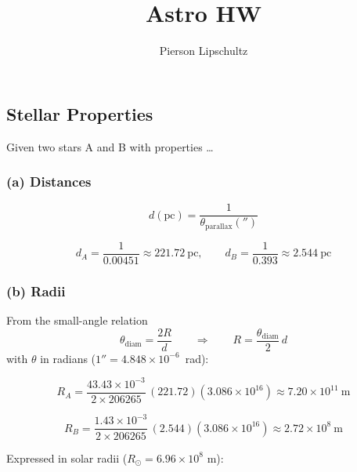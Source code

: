 \documentclass{article}
\title{Astro HW \hwNUM}
\author{Pierson Lipschultz}
\def\hwNUM{8}
\begin{document}
\maketitle


\setcounter{section}{\hwNUM}
\subsection{Stellar Properties}

Given two stars A and B with properties \dots

\begin{table}[htbp]
\end{table}

\subsubsection*{(a) Distances}

\[
d(\mathrm{pc}) = \frac{1}{\theta_\mathrm{parallax}('')}
\]

\[
d_A = \frac{1}{0.00451} \approx 221.72~\mathrm{pc}, \qquad
d_B = \frac{1}{0.393} \approx 2.544~\mathrm{pc}
\]

\subsubsection*{(b) Radii}

From the small-angle relation
\[
\theta_\mathrm{diam} = \frac{2R}{d} \qquad \Rightarrow \qquad R = \frac{\theta_\mathrm{diam}}{2}\,d
\]
with $\theta$ in radians ($1'' = 4.848\times10^{-6}$~rad):

\[
R_A = \frac{43.43\times10^{-3}}{2\times206265}\,(221.72)(3.086\times10^{16})
   \approx 7.20\times10^{11}~\mathrm{m}
\]

\[
R_B = \frac{1.43\times10^{-3}}{2\times206265}\,(2.544)(3.086\times10^{16})
   \approx 2.72\times10^{8}~\mathrm{m}
\]

Expressed in solar radii ($R_\odot=6.96\times10^{8}$ m):
\end{document}
